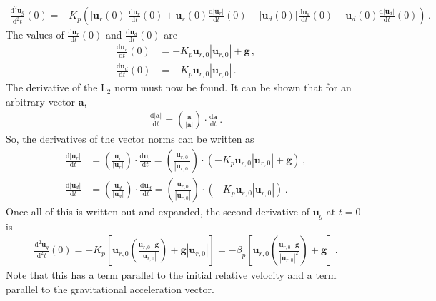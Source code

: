 \begin{align}
    \frac{\text{d}^2 \mathbf{u}_g}{\text{d}^2 t}(0) = -K_p \left(|\mathbf{u}_r(0)| \frac{\text{d} \mathbf{u}_r}{\text{d} t}(0) + \mathbf{u}_r(0) \frac{\text{d} |\mathbf{u}_r|}{\text{d} t}(0) - |\mathbf{u}_d(0)| \frac{\text{d} \mathbf{u}_d}{\text{d} t}(0) - \mathbf{u}_d(0) \frac{\text{d} |\mathbf{u}_d|}{\text{d} t}(0)\right) \,.
\end{align}
The values of $\frac{\text{d} \mathbf{u}_r}{\text{d} t}(0)$ and $\frac{\text{d} \mathbf{u}_d}{\text{d} t}(0)$ are
\begin{align*}
    \frac{\text{d} \mathbf{u}_r}{\text{d} t}(0) &= -K_p \mathbf{u}_{r,0} |\mathbf{u}_{r,0}| + \mathbf{g} \,, \\
    \frac{\text{d} \mathbf{u}_d}{\text{d} t}(0) &= -K_p \mathbf{u}_{r,0} |\mathbf{u}_{r,0}| \,.
\end{align*}
The derivative of the L$_2$ norm must now be found. It can be shown that for an arbitrary vector $\mathbf{a}$,
\begin{align*}
    \frac{\text{d} |\mathbf{a}|}{\text{d} t} = \left(\frac{\mathbf{a}}{|\mathbf{a}|}\right) \cdot \frac{\text{d} \mathbf{a}}{\text{d} t} \,.
\end{align*}
So, the derivatives of the vector norms can be written as
\begin{align}
    \frac{\text{d} |\mathbf{u}_r|}{\text{d} t} &= \left(\frac{\mathbf{u}_r}{|\mathbf{u}_r|}\right) \cdot \frac{\text{d} \mathbf{u}_r}{\text{d} t} = \left(\frac{\mathbf{u}_{r,0}}{|\mathbf{u}_{r,0}|}\right) \cdot (-K_p \mathbf{u}_{r,0} |\mathbf{u}_{r,0}| + \mathbf{g}) \,,  \\
    \frac{\text{d} |\mathbf{u}_d|}{\text{d} t} &= \left(\frac{\mathbf{u}_d}{|\mathbf{u}_d|}\right) \cdot \frac{\text{d} \mathbf{u}_d}{\text{d} t} = \left(\frac{\mathbf{u}_{r,0}}{|\mathbf{u}_{r,0}|}\right) \cdot (-K_p \mathbf{u}_{r,0} |\mathbf{u}_{r,0}|) \,.
\end{align}
Once all of this is written out and expanded, the second derivative of $\mathbf{u}_g$ at $t = 0$ is
\begin{align}
    \frac{\text{d}^2 \mathbf{u}_g}{\text{d}^2 t}(0) = -K_p \left[\mathbf{u}_{r,0} \left(\frac{\mathbf{u}_{r,0} \cdot \mathbf{g}}{|\mathbf{u}_{r,0}|}\right) + \mathbf{g} |\mathbf{u}_{r,0}|\right] = - \beta_p \left[\mathbf{u}_{r,0} \left(\frac{\mathbf{u}_{r,0} \cdot \mathbf{g}}{|\mathbf{u}_{r,0}|^2}\right) + \mathbf{g}\right] \,.
\end{align}
Note that this has a term parallel to the initial relative velocity and a term parallel to the gravitational acceleration vector.


